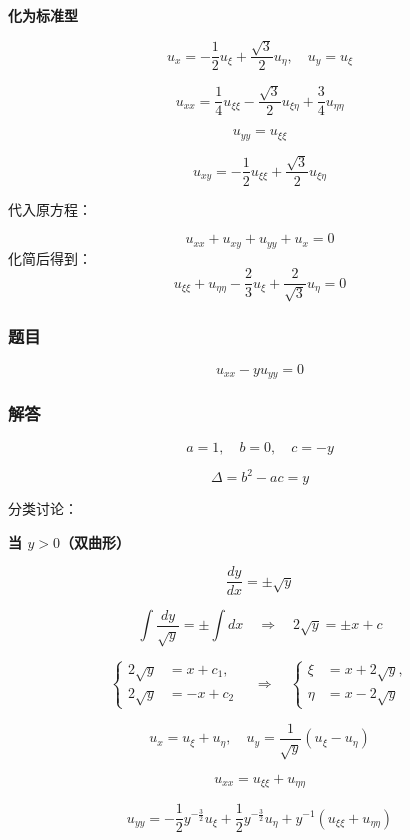 \textbf{化为标准型}

\[
u_x = -\frac{1}{2} u_{\xi} + \frac{\sqrt{3}}{2} u_{\eta}, \quad u_y = u_{\xi}
\]

\[
u_{xx} = \frac{1}{4} u_{\xi \xi} - \frac{\sqrt{3}}{2} u_{\xi \eta} + \frac{3}{4} u_{\eta \eta}
\]

\[
u_{yy} = u_{\xi \xi}
\]

\[
u_{xy} = -\frac{1}{2} u_{\xi \xi} + \frac{\sqrt{3}}{2} u_{\xi \eta}
\]

代入原方程：

\[
u_{xx} + u_{xy} + u_{yy} + u_x = 0
\]
化简后得到：
\[
u_{\xi \xi} + u_{\eta \eta} - \frac{2}{3} u_{\xi} + \frac{2}{\sqrt{3}} u_{\eta} = 0
\]

\subsubsection*{题目}
\[
u_{xx} - y u_{yy} = 0
\]

\subsubsection*{解答}

\[
a = 1, \quad b = 0, \quad c = -y
\]

\[
\Delta = b^2 - ac = y
\]

分类讨论：

\textbf{当 $y > 0$（双曲形）}

\[
\frac{dy}{dx} = \pm \sqrt{y}
\]

\[
\int \frac{dy}{\sqrt{y}} = \pm \int dx \quad \Longrightarrow \quad 2\sqrt{y} = \pm x + c
\]

\[
\left\{
\begin{aligned}
2\sqrt{y} &= x + c_1, \\
2\sqrt{y} &= -x + c_2
\end{aligned}
\right.
\quad \Longrightarrow \quad
\left\{
\begin{aligned}
\xi &= x + 2\sqrt{y}, \\
\eta &= x - 2\sqrt{y}
\end{aligned}
\right.
\]

\[
u_x = u_{\xi} + u_{\eta}, \quad u_y = \frac{1}{\sqrt{y}} ( u_{\xi} - u_{\eta} )
\]

\[
u_{xx} = u_{\xi \xi} + u_{\eta \eta}
\]

\[
u_{yy} = -\frac{1}{2} y^{- \frac{3}{2}} u_{\xi} + \frac{1}{2} y^{-\frac{3}{2}} u_{\eta} + y^{-1} (u_{\xi \xi} + u_{\eta \eta})
\]